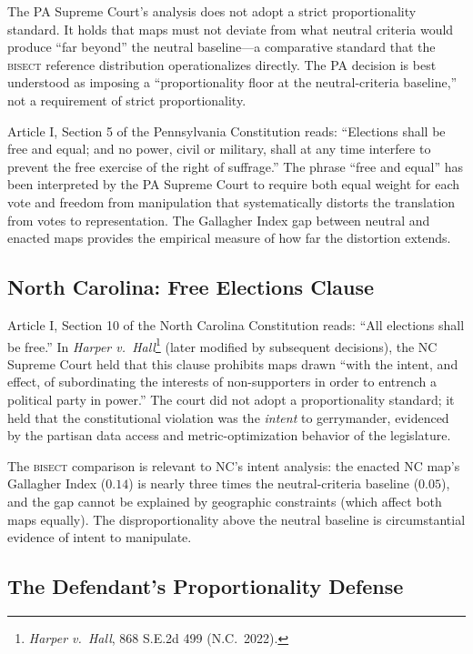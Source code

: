 The PA Supreme Court's analysis does not adopt a strict proportionality standard.
It holds that maps must not deviate from what neutral criteria would produce ``far
beyond'' the neutral baseline---a comparative standard that the \textsc{bisect}
reference distribution operationalizes directly. The PA decision is best understood
as imposing a ``proportionality floor at the neutral-criteria baseline,'' not a
requirement of strict proportionality.

Article I, Section 5 of the Pennsylvania Constitution reads: ``Elections shall be
free and equal; and no power, civil or military, shall at any time interfere to
prevent the free exercise of the right of suffrage.'' The phrase ``free and equal''
has been interpreted by the PA Supreme Court to require both equal weight for
each vote and freedom from manipulation that systematically distorts the translation
from votes to representation. The Gallagher Index gap between neutral and enacted
maps provides the empirical measure of how far the distortion extends.

\subsection{North Carolina: Free Elections Clause}

Article I, Section 10 of the North Carolina Constitution reads: ``All elections
shall be free.'' In \textit{Harper v.\ Hall}\footnote{\textit{Harper v.\ Hall},
868 S.E.2d 499 (N.C.\ 2022).} (later modified by subsequent decisions), the
NC Supreme Court held that this clause prohibits maps drawn ``with the intent,
and effect, of subordinating the interests of non-supporters in order to entrench
a political party in power.'' The court did not adopt a proportionality standard;
it held that the constitutional violation was the \textit{intent} to gerrymander,
evidenced by the partisan data access and metric-optimization behavior of the legislature.

The \textsc{bisect} comparison is relevant to NC's intent analysis: the enacted
NC map's Gallagher Index ($0.14$) is nearly three times the neutral-criteria
baseline ($0.05$), and the gap cannot be explained by geographic constraints
(which affect both maps equally). The disproportionality above the neutral
baseline is circumstantial evidence of intent to manipulate.

\subsection{The Defendant's Proportionality Defense}

